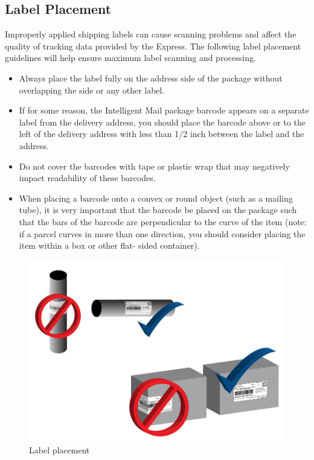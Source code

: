 \begin{appendices}
\chapter{Label Placement}
Improperly applied shipping labels can cause scanning problems and affect the quality of
tracking data provided by the Express. The following label placement guidelines will help ensure
maximum label scanning and processing.
\begin{itemize}
	\item Always place the label fully on the address side of the package without overlapping
the side or any other label.
	\item If for some reason, the Intelligent Mail package barcode appears on a separate label
from the delivery address, you should place the barcode above or to the left of the
delivery address with less than 1/2 inch between the label and the address.
	\item Do not cover the barcodes with tape or plastic wrap that may negatively impact
readability of these barcodes.
	\item When placing a barcode onto a convex or round object (such as a mailing tube), it is
very important that the barcode be placed on the package such that the bars of the
barcode are perpendicular to the curve of the item (note: if a parcel curves in more
than one direction, you should consider placing the item within a box or other flat-
sided container).
\end{itemize}
\begin{figure}[!h]
\includegraphics[width=15cm,keepaspectratio]{images/labeling_placement}
\caption{Label placement}
\end{figure}  
    

\end{appendices}
